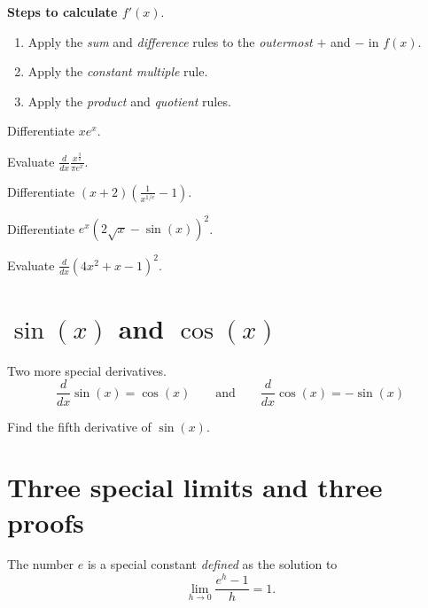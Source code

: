 \documentclass[../main.tex]{subfiles}
\begin{document}
\textbf{Steps to calculate \(f'(x)\)}. 
\begin{enumerate}[label=(\arabic*)]
  \item Apply the \emph{sum} and \emph{difference} rules to the \emph{outermost} \(+\) and \(-\) in \(f(x)\). 
  \item Apply the \emph{constant multiple} rule.
  \item Apply the \emph{product} and \emph{quotient} rules.
\end{enumerate}
\bigskip

\begin{example}
  Differentiate \(xe^{x}\).
\end{example}
\vspace{1in}

\begin{example}
  Evaluate \(\frac{d}{dx} \frac{x^{\frac{3}{2}}}{\pi e^{x}}\).
\end{example}
\vfill
\clearpage

\begin{example}
  Differentiate \((x+2)\left( \frac{1}{x^{1/e}} - 1 \right)\).
\end{example}
\vfill
\clearpage

\begin{example}
  Differentiate \(e^{x}(2 \sqrt{x} - \sin(x))^{2}\).
\end{example}
\clearpage

\begin{example}
  Evaluate \(\frac{d}{dx} (4x^{2} + x - 1)^{2}\).
\end{example}
\vfill
\clearpage

\section{\texorpdfstring{\(\sin(x)\) and \(\cos(x)\)}{sin(x) and cos(x)}}
\begin{mdframed}[style=simple]
  Two more special derivatives.
  \[
    \frac{d}{dx} \sin(x) = \cos(x)
    \qquad
    \text{and}
    \qquad
    \frac{d}{dx} \cos(x) = -\sin(x)
  \]
\end{mdframed}
\bigskip

\begin{example}
  Find the fifth derivative of \(\sin(x)\).
\end{example}
\clearpage

\section{Three special limits and three proofs}
The number \(e\) is a special constant \emph{defined} as the solution to
\begin{equation} \label{eq:limit-exp}
  \lim_{h \to 0} \frac{e^{h} - 1}{h} = 1.
\end{equation}
\end{document}
